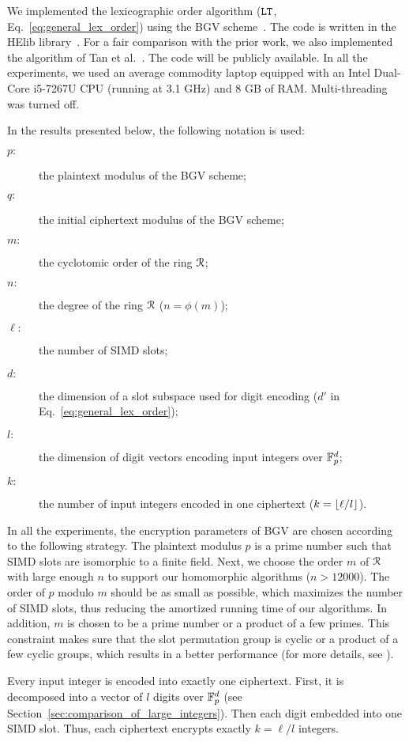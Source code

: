 We implemented the lexicographic order algorithm ($\mathtt{LT}$, Eq.~\ref{eq:general_lex_order}) using the BGV scheme~\cite{BGV12}.
The code is written in the HElib library~\cite{HElib}.
For a fair comparison with the prior work, we also implemented the algorithm of Tan et al.~\cite{TLWRK20}.
The code will be publicly available.
In all the experiments, we used an average commodity laptop equipped with an Intel Dual-Core i5-7267U CPU (running at 3.1 GHz) and 8 GB of RAM.
Multi-threading was turned off.

In the results presented below, the following notation is used:
\begin{description}
  \item[$p:$] the plaintext modulus of the BGV scheme;
  \item[$q:$] the initial ciphertext modulus of the BGV scheme;
  \item[$m:$] the cyclotomic order of the ring $\mathcal{R}$;
  \item[$n:$] the degree of the ring $\mathcal{R}$ ($n = \phi(m)$);
  \item[$\ell:$] the number of SIMD slots;
  \item[$d:$] the dimension of a slot subspace used for digit encoding ($d'$ in Eq.~\ref{eq:general_lex_order});
  \item[$l:$] the dimension of digit vectors encoding input integers over $\mathbb{F}_p^d$;
  \item[$k:$] the number of input integers encoded in one ciphertext ($k = \left\lfloor \ell/l \right\rfloor$).
\end{description}

In all the experiments, the encryption parameters of BGV are chosen according to the following strategy.
The plaintext modulus $p$ is a prime number such that SIMD slots are isomorphic to a finite field.
Next, we choose the order $m$ of $\mathcal{R}$ with large enough $n$ to support our homomorphic algorithms ($n > 12000$).
The order of $p$ modulo $m$ should be as small as possible, which maximizes the number of SIMD slots, thus reducing the amortized running time of our algorithms.
In addition, $m$ is chosen to be a prime number or a product of a few primes.
This constraint makes sure that the slot permutation group is cyclic or a product of a few cyclic groups, which results in a better performance (for more details, see \cite[Appendix C.3]{GHS12}).

Every input integer is encoded into exactly one ciphertext.
First, it is decomposed into a vector of $l$ digits over $\mathbb{F}_p^d$ (see Section~\ref{sec:comparison_of_large_integers}).
Then each digit embedded into one SIMD slot.
Thus, each ciphertext encrypts exactly $k = \ell/l$ integers.

